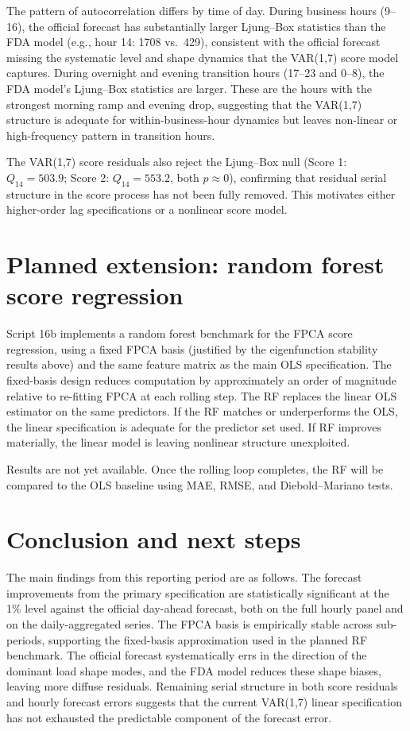 \documentclass[10pt,a4paper]{article}
\begin{document}
The pattern of autocorrelation differs by time of day. During business hours (9--16), the official forecast has substantially larger Ljung--Box statistics than the FDA model (e.g., hour 14: 1708 vs.\ 429), consistent with the official forecast missing the systematic level and shape dynamics that the VAR(1,7) score model captures. During overnight and evening transition hours (17--23 and 0--8), the FDA model's Ljung--Box statistics are larger. These are the hours with the strongest morning ramp and evening drop, suggesting that the VAR(1,7) structure is adequate for within-business-hour dynamics but leaves non-linear or high-frequency pattern in transition hours.

The VAR(1,7) score residuals also reject the Ljung--Box null (Score 1: \(Q_{14} = 503.9\); Score 2: \(Q_{14} = 553.2\), both \(p \approx 0\)), confirming that residual serial structure in the score process has not been fully removed. This motivates either higher-order lag specifications or a nonlinear score model.

\section*{Planned extension: random forest score regression}

Script 16b implements a random forest benchmark for the FPCA score regression, using a fixed FPCA basis (justified by the eigenfunction stability results above) and the same feature matrix as the main OLS specification. The fixed-basis design reduces computation by approximately an order of magnitude relative to re-fitting FPCA at each rolling step. The RF replaces the linear OLS estimator on the same predictors. If the RF matches or underperforms the OLS, the linear specification is adequate for the predictor set used. If RF improves materially, the linear model is leaving nonlinear structure unexploited.

Results are not yet available. Once the rolling loop completes, the RF will be compared to the OLS baseline using MAE, RMSE, and Diebold--Mariano tests.

\section*{Conclusion and next steps}

The main findings from this reporting period are as follows. The forecast improvements from the primary specification are statistically significant at the 1\% level against the official day-ahead forecast, both on the full hourly panel and on the daily-aggregated series. The FPCA basis is empirically stable across sub-periods, supporting the fixed-basis approximation used in the planned RF benchmark. The official forecast systematically errs in the direction of the dominant load shape modes, and the FDA model reduces these shape biases, leaving more diffuse residuals. Remaining serial structure in both score residuals and hourly forecast errors suggests that the current VAR(1,7) linear specification has not exhausted the predictable component of the forecast error.
\end{document}
